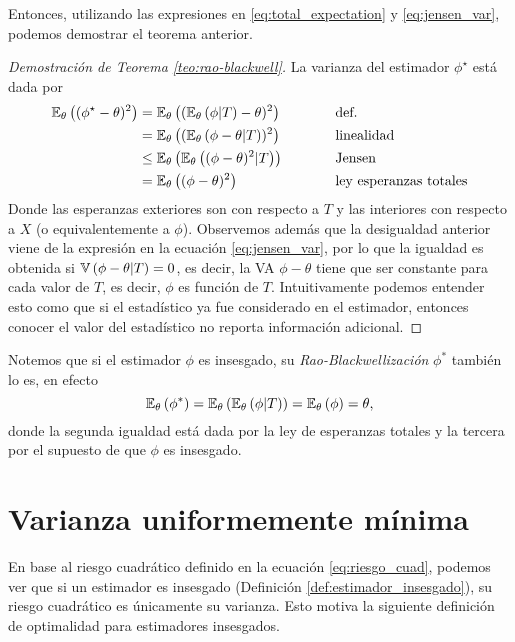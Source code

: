 Entonces, utilizando las expresiones en \eqref{eq:total_expectation} y \eqref{eq:jensen_var}, podemos demostrar el teorema anterior.

 \begin{proof}[Demostración de Teorema \ref{teo:rao-blackwell}]
 	La varianza del estimador $\phi^\star$ está dada por 
 	\begin{alignat*}{2}
 		\mathbb{E}_\theta \left((\phi^\star-\theta)^2\right) &= \mathbb{E}_\theta \left((\mathbb{E}_\theta \left(\phi|T\right)-\theta)^2\right) \quad\quad\quad &&\text{def.}\\
 								&= \mathbb{E}_\theta \left((\mathbb{E}_\theta \left(\phi-\theta|T\right))^2\right)&& \text{linealidad}\\
 								&\leq \mathbb{E}_\theta \left(\mathbb{E}_\theta \left((\phi-\theta)^2|T\right)\right)&& \text{Jensen}\\
 								&= \mathbb{E}_\theta \left((\phi-\theta)^2\right) &&\text{ley esperanzas totales}
 	\end{alignat*}
Donde las esperanzas exteriores son con respecto a $T$ y las interiores con respecto a $X$ (o equivalentemente a $\phi$).  Observemos además que la desigualdad anterior viene de la expresión en la ecuación \eqref{eq:jensen_var}, por lo que la igualdad es obtenida si $\mathbb{V} \left(\phi-\theta|T\right) = 0$, es decir, la VA $\phi-\theta$ tiene que ser constante para cada valor de $T$, es decir, $\phi$ es función de $T$. Intuitivamente podemos entender esto como que si el estadístico ya fue considerado en el estimador, entonces conocer el valor del estadístico no reporta información adicional. 
 \end{proof}

\begin{remark}
	Notemos que si el estimador $\phi$ es insesgado, su \textit{Rao-Blackwellización} $\phi^*$ también lo es, en efecto
	\begin{equation}
		\mathbb{E}_\theta \left(\phi^*\right) = \mathbb{E}_\theta \left(\mathbb{E}_\theta \left(\phi|T\right)\right) = \mathbb{E}_\theta \left(\phi\right) = \theta,
	\end{equation}
	donde la segunda igualdad está dada por la ley de esperanzas totales y la tercera por el supuesto de que $\phi$ es insesgado.
\end{remark}

\section{Varianza uniformemente mínima}

En base al riesgo cuadrático definido en la ecuación \eqref{eq:riesgo_cuad}, podemos ver que si un estimador es insesgado (Definición \ref{def:estimador_insesgado}), su riesgo cuadrático es únicamente su varianza. Esto motiva la siguiente definición de optimalidad para estimadores insesgados. 

